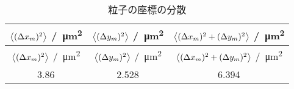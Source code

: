 \begin{longtable}{ccc}
    \caption{粒子の座標の分散} \label{tab:position-variance}                                                                                                                                     \\
    \hline $\left< (\Delta x_m)^2 \right>$ /\SI{}{\micro\meter\squared} & $\left< (\Delta y_m)^2 \right>$ /\SI{}{\micro\meter\squared} & $\left< (\Delta x_m)^2 + (\Delta y_m)^2 \right>$ /\SI{}{\micro\meter\squared} \\ \hline
    \endfirsthead
    \hline $\left< (\Delta x_m)^2 \right>$ /\SI{}{\micro\meter\squared} & $\left< (\Delta y_m)^2 \right>$ /\SI{}{\micro\meter\squared} & $\left< (\Delta x_m)^2 + (\Delta y_m)^2 \right>$ /\SI{}{\micro\meter\squared} \\ \hline
    \endhead
    \hline
    \endfoot

    3.86                                                      & 2.528                                              & 6.394                                                               \\
\end{longtable}
